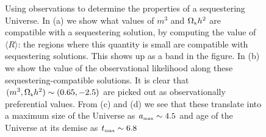 \documentclass[amsmath,amssymb,12pt,eqsecnum]{revtex4}
\begin{document}
\begin{figure}[!t]
\begin{center}
      \end{center}
\caption{Using observations to determine the properties of a sequestering Universe.  In (a) we  show what values of $m^3$ and ${\Omega}_{\scriptscriptstyle{\textrm{k}}}h^2$ are compatible with a sequestering solution, by computing the value of $\langle R\rangle$: the regions where this quantity is small are compatible with sequestering solutions. This shows up as a band in the figure. In (b) we show the value of the observational likelihood along these sequestering-compatible solutions. It is clear that $(m^3, {\Omega}_{\scriptscriptstyle{\textrm{k}}}h^2)\sim (0.65,-2.5)$ are picked out as observationally preferential values. From (c) and (d) we see that these translate into a maximum size of the Universe as ${a}_{\scriptscriptstyle{\textrm{max}}} \sim 4.5$ and age of the Universe at its demise as ${t}_{\scriptscriptstyle{\textrm{max}}} \sim 6.8$  }\label{fig:plots3}
\end{figure}



\end{document}
